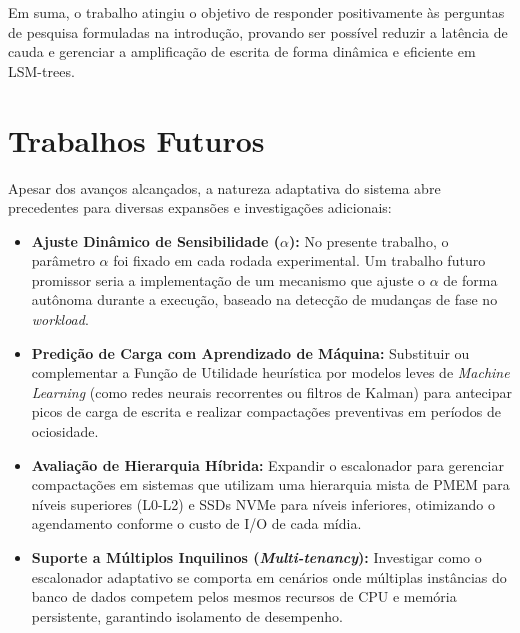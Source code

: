 Em suma, o trabalho atingiu o objetivo de responder positivamente às perguntas de pesquisa formuladas na introdução, provando ser possível reduzir a latência de cauda e gerenciar a amplificação de escrita de forma dinâmica e eficiente em LSM-trees.

\section*{Trabalhos Futuros}

Apesar dos avanços alcançados, a natureza adaptativa do sistema abre precedentes para diversas expansões e investigações adicionais:

\begin{itemize}
    \item \textbf{Ajuste Dinâmico de Sensibilidade ($\alpha$):} No presente trabalho, o parâmetro $\alpha$ foi fixado em cada rodada experimental. Um trabalho futuro promissor seria a implementação de um mecanismo que ajuste o $\alpha$ de forma autônoma durante a execução, baseado na detecção de mudanças de fase no \textit{workload}.
    \item \textbf{Predição de Carga com Aprendizado de Máquina:} Substituir ou complementar a Função de Utilidade heurística por modelos leves de \textit{Machine Learning} (como redes neurais recorrentes ou filtros de Kalman) para antecipar picos de carga de escrita e realizar compactações preventivas em períodos de ociosidade.
    \item \textbf{Avaliação de Hierarquia Híbrida:} Expandir o escalonador para gerenciar compactações em sistemas que utilizam uma hierarquia mista de PMEM para níveis superiores (L0-L2) e SSDs NVMe para níveis inferiores, otimizando o agendamento conforme o custo de I/O de cada mídia.
    \item \textbf{Suporte a Múltiplos Inquilinos (\textit{Multi-tenancy}):} Investigar como o escalonador adaptativo se comporta em cenários onde múltiplas instâncias do banco de dados competem pelos mesmos recursos de CPU e memória persistente, garantindo isolamento de desempenho.
\end{itemize}
